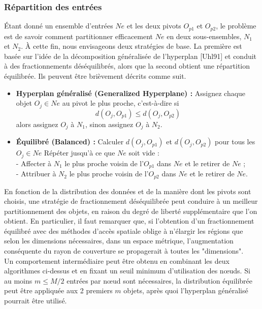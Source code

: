 \subsubsection{Répartition des entrées}
Étant donné un ensemble d'entrées $ Ne $ et les deux pivots $ O_{p1} $ et $ O_{p2} $, le problème est de savoir comment partitionner efficacement $ Ne $ en deux sous-ensembles, $  N_1 $ et $ N_2 $. À cette fin, nous envisageons deux stratégies de base. La première est basée sur l'idée de la décomposition généralisée de l'hyperplan [Uhl91] et conduit à des fractionnements déséquilibrés, alors que la second obtient une répartition équilibrée. Ils peuvent être brièvement décrits comme suit.
\begin{itemize}
	\item \textbf{Hyperplan généralisé (Generalized Hyperplane) :} Assignez chaque objet $ O_j \in Ne $ au  pivot le plus proche, c'est-à-dire si  \begin{displaymath}
		d(O_j, O_{p1}) \le d(O_j, O_{p2}) 
	\end{displaymath} alors assignez $ O_j $ à $ N_1 $, sinon assignez $ O_j $ à $ N_2 $.
	
	\item \textbf{Équilibré (Balanced) :} Calculer $ d(O_j, O_{p1}) $ et $ d(O_j, O_{p2}) $ pour tous les $ O_j \in Ne $ Répéter jusqu'à ce que $ Ne $ soit vide :\\
	 - Affecter à $ N_1 $ le plus proche voisin de l'$ O_{p1} $ dans $ Ne $ et le retirer de $ Ne $ ;\\
	 - Attribuer à $ N_2 $ le plus proche voisin de l'$ O_{p2} $ dans $ Ne $ et le retirer de $ Ne $.
\end{itemize}
En fonction de la distribution des données et de la manière dont les pivots sont choisis, une stratégie de fractionnement déséquilibrée peut conduire à un meilleur partitionnement des objets, en raison du degré de liberté supplémentaire que l'on obtient. En particulier, il faut remarquer que, si l'obtention d'un fractionnement équilibré avec des méthodes d'accès spatiale oblige à n'élargir les régions que selon les dimensions nécessaires, dans un espace métrique, l'augmentation conséquente du rayon de couverture se propagerait à toutes les "dimensions".\\

Un comportement intermédiaire peut être obtenu en combinant les deux algorithmes ci-dessus et en fixant un seuil minimum d'utilisation des nœuds. Si au moins $ m \le M/2 $ entrées par nœud sont nécessaires, la distribution équilibrée peut être appliquée aux 2 premiers $ m $ objets, après quoi l'hyperplan généralisé pourrait être utilisé. 


